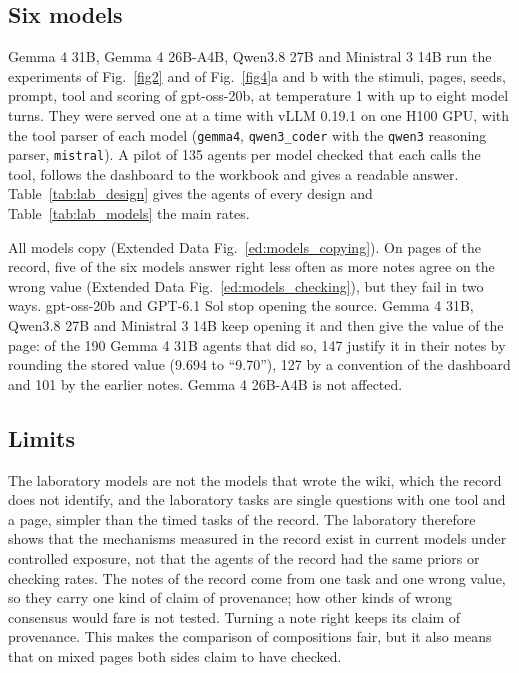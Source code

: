 \documentclass[10pt]{article}
\begin{document}
\subsection{Six models}\label{sec:lab_models}
Gemma 4 31B, Gemma 4 26B-A4B, Qwen3.8 27B and Ministral 3 14B run the experiments of Fig.~\ref{fig2} and of Fig.~\ref{fig4}a and b with the stimuli, pages, seeds, prompt, tool and scoring of gpt-oss-20b, at temperature 1 with up to eight model turns. They were served one at a time with vLLM 0.19.1 on one H100 GPU, with the tool parser of each model (\texttt{gemma4}, \texttt{qwen3\_coder} with the \texttt{qwen3} reasoning parser, \texttt{mistral}). A pilot of 135 agents per model checked that each calls the tool, follows the dashboard to the workbook and gives a readable answer. Table~\ref{tab:lab_design} gives the agents of every design and Table~\ref{tab:lab_models} the main rates.

All models copy (Extended Data Fig.~\ref{ed:models_copying}). On pages of the record, five of the six models answer right less often as more notes agree on the wrong value (Extended Data Fig.~\ref{ed:models_checking}), but they fail in two ways. gpt-oss-20b and GPT-6.1 Sol stop opening the source. Gemma 4 31B, Qwen3.8 27B and Ministral 3 14B keep opening it and then give the value of the page: of the 190 Gemma 4 31B agents that did so, 147 justify it in their notes by rounding the stored value (9.694 to ``9.70''), 127 by a convention of the dashboard and 101 by the earlier notes. Gemma 4 26B-A4B is not affected.

\begin{table}[htbp]\centering\small
\caption{\textbf{The six models at the ends of the designs.} The percentage of agents that open the source, that answer right, and that answer the wrong value among those that opened the source, on pages of 32 notes of the record all giving the wrong value (Fig.~\ref{fig4}a), 20 notes of the record all giving the wrong value (Fig.~\ref{fig4}b), 32 synthetic notes all giving the wrong value, and 20 synthetic notes half of which are right (for GPT-6.1 Sol, 60\% right).}\label{tab:lab_models}
\resizebox{\textwidth}{!}{}
\end{table}

\subsection{Limits}
The laboratory models are not the models that wrote the wiki, which the record does not identify, and the laboratory tasks are single questions with one tool and a page, simpler than the timed tasks of the record. The laboratory therefore shows that the mechanisms measured in the record exist in current models under controlled exposure, not that the agents of the record had the same priors or checking rates. The notes of the record come from one task and one wrong value, so they carry one kind of claim of provenance; how other kinds of wrong consensus would fare is not tested. Turning a note right keeps its claim of provenance. This makes the comparison of compositions fair, but it also means that on mixed pages both sides claim to have checked.
\end{document}
